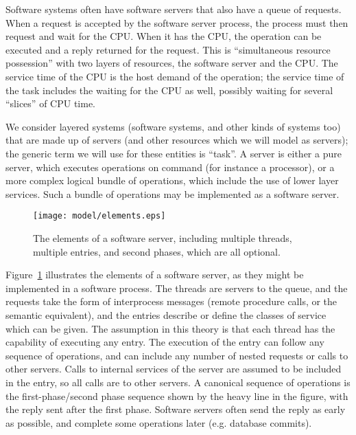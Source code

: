 \documentclass[11pt]{article}
\begin{document}
Software systems often have software servers that also have a queue of requests. When a
request is accepted by the software server process, the process must then request and wait for the
CPU. When it has the CPU, the operation can be executed and a reply returned for the request. This
is ``simultaneous resource possession'' with two layers of resources, the software server and the
CPU. The service time of the CPU is the host demand of the operation; the service time of the task
includes the waiting for the CPU as well, possibly waiting for several
``slices'' of CPU time.

We consider layered systems (software systems, and other kinds of
systems too) that are made up of servers (and other resources which we
will model as servers); the generic term we will use for these
entities is ``task''. A server is either a pure server, which executes
operations on command (for instance a processor), or a more complex
logical bundle of operations, which include the use of lower layer
services. Such a bundle of operations may be implemented as a software
server.

\begin{figure}[h]
  \centering
  \texttt{[image: model/elements.eps]}
  \caption{The elements of a software server, including multiple
  threads, multiple entries, and second phases, which are all
  optional.} 
  \label{fig:elements}
\end{figure}

Figure~\ref{fig:elements} illustrates the elements of a software
server, as they might be implemented in a software process. The
threads are servers to the queue, and the requests take the form of
interprocess messages (remote procedure calls, or the semantic
equivalent), and the entries describe or define the classes of service
which can be given. The assumption in this theory is that each thread
has the capability of executing any entry.  The execution of the entry
can follow any sequence of operations, and can include any number of
nested requests or calls to other servers. Calls to internal services
of the server are assumed to be included in the entry, so all calls
are to other servers. A canonical sequence of operations is the
first-phase/second phase sequence shown by the heavy line in the
figure, with the reply sent after the first phase. Software servers
often send the reply as early as possible, and complete some
operations later (e.g. database commits).
\end{document}
